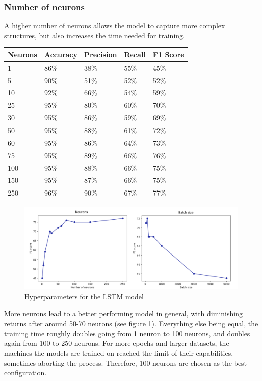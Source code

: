 \documentclass[
a4paper,
pagesize,
pdftex,
12pt,
ngerman,
fleqn,
final,
]{scrartcl}
\begin{document}
	\subsubsection{Number of neurons}
	A higher number of neurons allows the model to capture more complex structures, but also increases the time needed for training.
	
	\begin{tabular}{ | p{2cm} || p{2cm}|p{2cm}|p{2cm}|p{2cm}|  }
		\hline
		Neurons & Accuracy & Precision & Recall & F1 Score \\
		\hline
		1 & 86\% & 38\% & 55\% & 45\% \\
		5 & 90\% &  51\% &  52\% &  52\% \\
		10 & 92\% &  66\% &  54\% &  59\% \\
		25 & 95\% &  80\% &  60\% &  70\% \\
		30 & 95\% &  86\% &  59\% &  69\% \\
		50 & 95\% &  88\% &  61\% &  72\% \\
		60 & 95\% &  86\% &  64\% &  73\%\\
		75 & 95\% &  89\% &  66\% &  76\% \\
		100 & 95\% &  88\% &  66\% &  75\% \\
		150 & 95\% &  87\% &  66\% &  75\% \\
		250 & 96\% &  90\% &  67\% &  77\% \\
		\hline
		\hline

	\end{tabular}
			\begin{figure}[h]
		\centering
		\includegraphics[width=1\textwidth]{img/hyper1}
		\caption{Hyperparameters for the LSTM model}
		\label{fig:hyper1}
	\end{figure}

	More neurons lead to a better performing model in general, with diminishing returns after around 50-70 neurons (see figure \ref{fig:hyper1}). Everything else being equal, the training time roughly doubles going from 1 neuron to 100 neurons, and doubles again from 100 to 250 neurons. For more epochs and larger datasets, the machines the models are trained on reached the limit of their capabilities, sometimes aborting the process. Therefore, 100 neurons are chosen as the best configuration.
	
\end{document}
